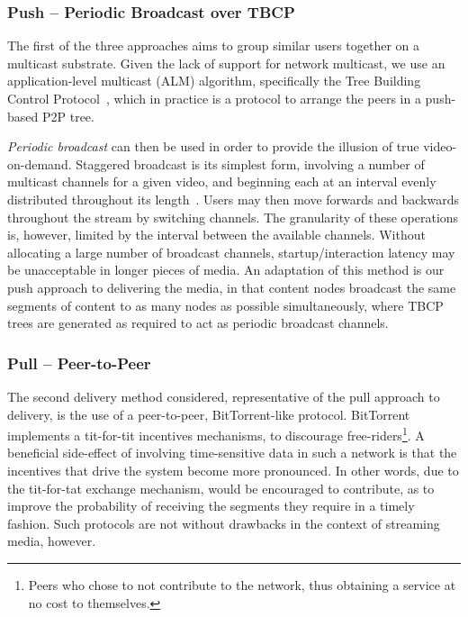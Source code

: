 \subsubsection{Push -- Periodic Broadcast over TBCP}

The first of the three approaches aims to group similar users together on a multicast substrate. Given the lack of support for network multicast, we use an application-level multicast (ALM) algorithm, specifically the Tree Building Control Protocol~\cite{mathy01otb}, which in practice is a protocol to arrange the peers in a push-based P2P tree.

\emph{Periodic broadcast} can then be used in order to provide the illusion of true video-on-demand. Staggered broadcast is its simplest form, involving a number of multicast channels for a given video, and beginning each at an interval evenly distributed throughout its length~\cite{dau95cab}. Users may then move forwards and backwards throughout the stream by switching channels. The granularity of these operations is, however, limited by the interval between the available channels. Without allocating a large number of broadcast channels, startup/interaction latency may be unacceptable in longer pieces of media. An adaptation of this method is our push approach to delivering the media, in that content nodes broadcast the same segments of content to as many nodes as possible simultaneously, where TBCP trees are generated as required to act as periodic broadcast channels.

\subsubsection{Pull -- Peer-to-Peer}
\label{sect:pull}

The second delivery method considered, representative of the pull approach to delivery, is the use of a peer-to-peer, BitTorrent-like protocol. BitTorrent implements a tit-for-tit incentives mechanisms, to discourage free-riders\footnote{Peers who chose to not contribute to the network, thus obtaining a service at no cost to themselves.}. A beneficial side-effect of involving time-sensitive data in such a network is that the incentives that drive the system become more pronounced. In other words, due to the tit-for-tat exchange mechanism,  would be encouraged to contribute, as to improve the probability of receiving the segments they require in a timely fashion. Such protocols are not without drawbacks in the context of streaming media, however.

